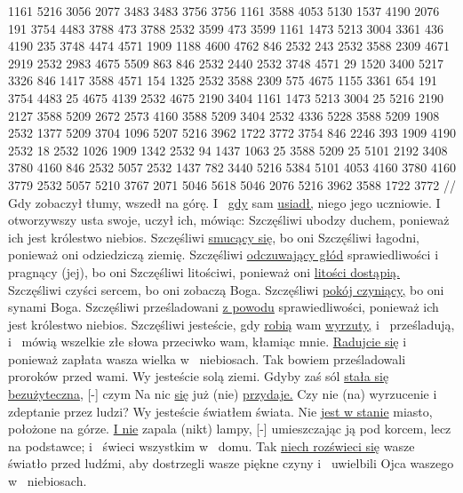 {} 1161 5216 3056 2077 3483 3483 3756 3756 1161 3588 4053 5130 1537 4190 2076
{} 191 3754 4483 3788 473 3788 2532 3599 473 3599
{} 1161 1473 5213 3004 3361 436 4190 235 3748 4474 4571 1909 1188 4600 4762 846 2532 243
{} 2532 3588 2309 4671 2919 2532 2983 4675 5509 863 846 2532 2440
{} 2532 3748 4571 29 {} 1520 3400 5217 3326 846 1417
{} 3588 4571 154 1325 2532 3588 2309 575 4675 1155 3361 654
{} 191 3754 4483 25 4675 4139 2532 4675 2190 3404
{} 1161 1473 5213 3004 25 5216 2190 2127 3588 5209 2672 2573 4160 3588 5209 3404 2532 4336 5228 3588 5209 1908 2532 1377 5209
{} 3704 1096 5207 5216 3962 1722 3772 3754 846 2246 393 1909 4190 2532 18 2532 1026 1909 1342 2532 94
{} 1437 1063 25 3588 5209 25 5101 2192 3408 3780 4160 846 2532 5057
{} 2532 1437 782 3440 5216 5384 5101 4053 4160 3780 4160 3779 2532 5057
{} 5210 3767 2071 5046 5618 5046 2076 5216 3962 3588 1722 3772
//
\glb
 Gdy zobaczył tłumy, wszedł na górę. I~ \underline{gdy} sam \underline{usiadł,}  niego jego uczniowie.
 I~ otworzywszy usta swoje, uczył ich, mówiąc:
 Szczęśliwi ubodzy duchem, ponieważ ich jest królestwo niebios.
 Szczęśliwi \underline{smucący się,} bo oni 
 Szczęśliwi łagodni, ponieważ oni odziedziczą ziemię.
 Szczęśliwi \underline{odczuwający głód} sprawiedliwości i~ pragnący (jej), bo oni 
 Szczęśliwi litościwi, ponieważ oni \underline{litości dostąpią.}
 Szczęśliwi czyści sercem, bo oni zobaczą Boga.
 Szczęśliwi \underline{pokój czyniący,} bo oni  synami Boga.
 Szczęśliwi prześladowani \underline{z powodu} sprawiedliwości, ponieważ ich jest królestwo niebios.
 Szczęśliwi jesteście, gdy \underline{robią} wam \underline{wyrzuty,} i~ prześladują, i~ mówią wszelkie złe słowa przeciwko wam, kłamiąc  mnie.
 \underline{Radujcie się} i~  ponieważ zapłata wasza wielka w~ niebiosach. Tak bowiem prześladowali proroków przed wami.
 Wy jesteście solą ziemi. Gdyby zaś sól \underline{stała się bezużyteczna,} [-] czym  Na nic \underline{się} już (nie) \underline{przydaje.} Czy nie (na) wyrzucenie  i~ zdeptanie przez ludzi?
 Wy jesteście światłem świata. Nie \underline{jest w stanie}  miasto, położone na górze.
 \underline{I nie} zapala (nikt) lampy, [-] umieszczając ją pod korcem, lecz na podstawce; i~ świeci wszystkim w~ domu.
 Tak \underline{niech rozświeci się} wasze światło przed ludźmi, aby dostrzegli wasze piękne czyny i~ uwielbili Ojca waszego w~ niebiosach.
